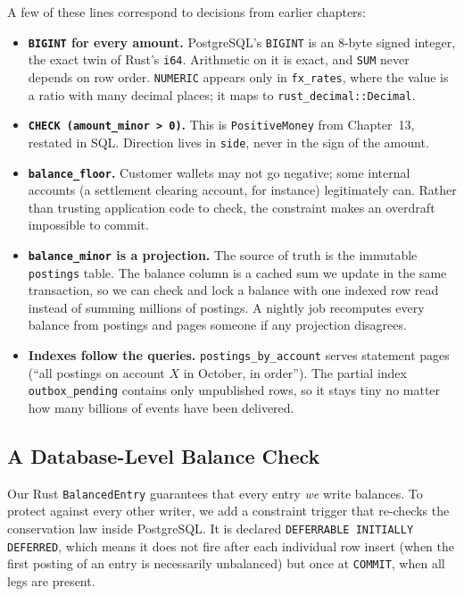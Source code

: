 A few of these lines correspond to decisions from earlier chapters:
\begin{itemize}
  \item \textbf{\texttt{BIGINT} for every amount.} PostgreSQL's \texttt{BIGINT} is an 8-byte signed integer, the exact twin of Rust's \texttt{i64}. Arithmetic on it is exact, and \texttt{SUM} never depends on row order. \texttt{NUMERIC} appears only in \texttt{fx\_rates}, where the value is a ratio with many decimal places; it maps to \texttt{rust\_decimal::Decimal}.
  \item \textbf{\texttt{CHECK (amount\_minor > 0)}.} This is \texttt{PositiveMoney} from Chapter~13, restated in SQL. Direction lives in \texttt{side}, never in the sign of the amount.
  \item \textbf{\texttt{balance\_floor}.} Customer wallets may not go negative; some internal accounts (a settlement clearing account, for instance) legitimately can. Rather than trusting application code to check, the constraint makes an overdraft impossible to commit.
  \item \textbf{\texttt{balance\_minor} is a projection.} The source of truth is the immutable \texttt{postings} table. The balance column is a cached sum we update in the same transaction, so we can check and lock a balance with one indexed row read instead of summing millions of postings. A nightly job recomputes every balance from postings and pages someone if any projection disagrees.
  \item \textbf{Indexes follow the queries.} \texttt{postings\_by\_account} serves statement pages (``all postings on account $X$ in October, in order''). The partial index \texttt{outbox\_pending} contains only unpublished rows, so it stays tiny no matter how many billions of events have been delivered.
\end{itemize}

\subsection{A Database-Level Balance Check}

Our Rust \texttt{BalancedEntry} guarantees that every entry \emph{we} write balances. To protect against every other writer, we add a constraint trigger that re-checks the conservation law inside PostgreSQL. It is declared \texttt{DEFERRABLE INITIALLY DEFERRED}, which means it does not fire after each individual row insert (when the first posting of an entry is necessarily unbalanced) but once at \texttt{COMMIT}, when all legs are present.

